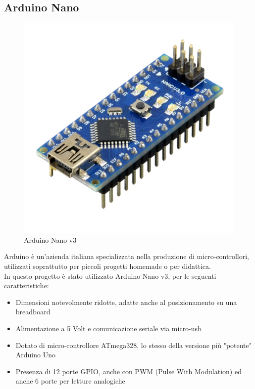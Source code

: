 \documentclass[12pt]{report}
\begin{document}
\subsection*{Arduino Nano}
\begin{figure}
\vspace{20pt}
\includegraphics[width=0.85\linewidth]{images/components/arduino_nano.jpg} 
\caption{Arduino Nano v3}
\vspace{-20pt}
\label{fig:wrapfig}
\end{figure}
Arduino è un'azienda italiana specializzata nella produzione di micro-controllori, utilizzati soprattutto per piccoli progetti homemade o per didattica.\\
In questo progetto è stato utilizzato Arduino Nano v3, per le seguenti caratteristiche:

\begin{itemize}
    \item Dimensioni notevolmente ridotte, adatte anche al posizionamento su una breadboard
    \item Alimentazione a 5 Volt e comunicazione seriale via micro-usb 
    \item Dotato di micro-controllore ATmega328, lo stesso della versione più "potente" Arduino Uno 
    \item Presenza di 12 porte GPIO, anche con PWM (Pulse With Modulation) ed anche 6 porte per letture analogiche
\end{itemize}
\vspace{0.5cm}
\end{document}
